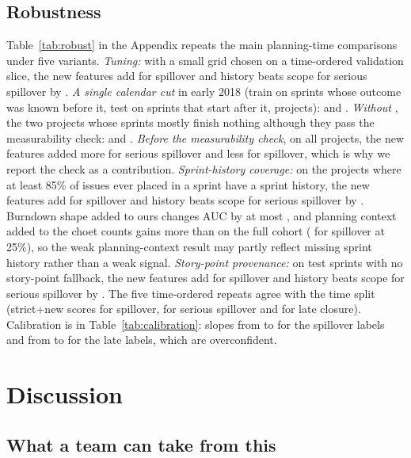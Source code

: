 \subsection{Robustness}
\label{sec:robust}

Table~\ref{tab:robust} in the Appendix repeats the main planning-time comparisons under five variants. \emph{Tuning:} with a small grid chosen on a time-ordered validation slice, the new features add \dPUNewSp{} \cPUNewSp{} for spillover and history beats scope for serious spillover by \dPUHistSs{} \cPUHistSs. \emph{A single calendar cut} in early 2018 (train on sprints whose outcome was known before it, test on sprints that start after it, \CutProj{} projects): \dPKNewSp{} \cPKNewSp{} and \dPKHistSs{} \cPKHistSs. \emph{Without \RestrictedProj}, the two projects whose sprints mostly finish nothing although they pass the measurability check: \dPRNewSp{} \cPRNewSp{} and \dPRHistSs{} \cPRHistSs. \emph{Before the measurability check}, on all \NProjExport{} projects, the new features added more for serious spillover and less for spillover, which is why we report the check as a contribution. \emph{Sprint-history coverage:} on the \HistProj{} projects where at least 85\% of issues ever placed in a sprint have a sprint history, the new features add \dPHNewSp{} \cPHNewSp{} for spillover and history beats scope for serious spillover by \dPHHistSs{} \cPHHistSs. Burndown shape added to ours changes AUC by at most \HistAddMax, and planning context added to the choet counts gains more than on the full cohort (\dIHCtxSpA{} \cIHCtxSpA{} for spillover at 25\%), so the weak planning-context result may partly reflect missing sprint history rather than a weak signal. \emph{Story-point provenance:} on test sprints with no story-point fallback, the new features add \dPFNewSp{} \cPFNewSp{} for spillover and history beats scope for serious spillover by \dPFHistSs{} \cPFHistSs. The five time-ordered repeats agree with the time split (strict+new scores \repSp{} for spillover, \repSs{} for serious spillover and \repLc{} for late closure). Calibration is in Table~\ref{tab:calibration}: slopes from \SlopeSpMin{} to \SlopeSpMax{} for the spillover labels and from \SlopeLateMin{} to \SlopeLateMax{} for the late labels, which are overconfident.

\section{Discussion}
\label{sec:discussion}

\subsection{What a team can take from this}

